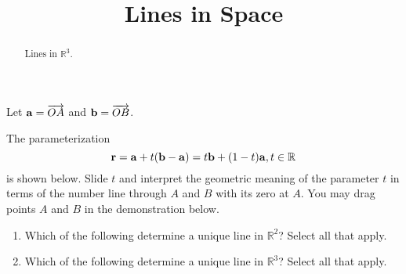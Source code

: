 \documentclass{ximera}
\title{Lines in Space}
\begin{document}
\begin{abstract}
Lines in $\mathbb{R}^3$.
\end{abstract}
\maketitle


\begin{exploration}   \label{Exsd67g:Line}
Let ${\bf a} = \overrightarrow{OA}$ and  ${\bf b} = \overrightarrow{OB}$.

The parameterization 
\[
    {\bf r} = {\bf a} + t({\bf b} - {\bf a}) = t{\bf b} + (1-t){\bf a} , t\in \mathbb{R}
\]
is shown below. Slide $t$ and interpret the geometric meaning of the parameter $t$ in terms of the number line through $A$ and $B$ with its zero at $A$. You may drag points $A$ and $B$ in the demonstration below.

 
\begin{onlineOnly}
    \begin{center}
\end{center}
\end{onlineOnly}

\end{exploration}


\begin{question} \label{Qf4tlhlnm4}
\begin{enumerate}

\item Which of the following determine a unique line in $\mathbb{R}^2$? Select all that apply.
\begin{selectAll}
\end{selectAll}

\item Which of the following determine a unique line in $\mathbb{R}^3$? Select all that apply.
\begin{selectAll}
\end{selectAll}

\end{enumerate}
\end{question}
\end{document}
